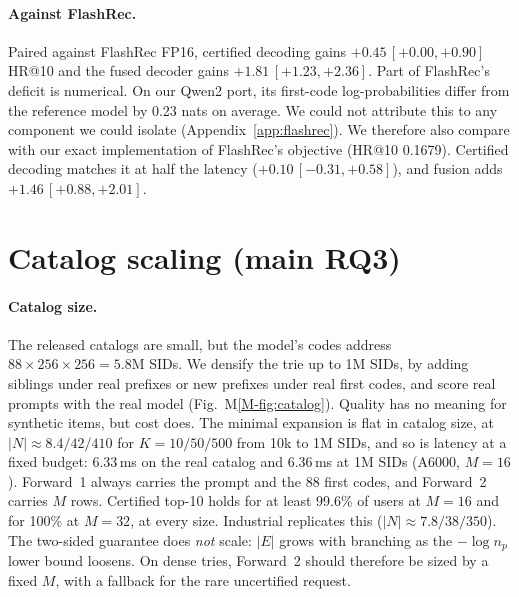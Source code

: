 \documentclass[sigconf,anonymous]{acmart}
\begin{document}
\paragraph{Against FlashRec.} Paired against FlashRec FP16, certified decoding gains $+0.45\,[+0.00,+0.90]$
HR@10 and the fused decoder gains $+1.81\,[+1.23,+2.36]$. Part of FlashRec's deficit is numerical. On our Qwen2
port, its first-code log-probabilities differ from the reference model by 0.23 nats on average. We could not
attribute this to any component we could isolate (Appendix~\ref{app:flashrec}). We therefore also compare with
our exact implementation of FlashRec's objective (HR@10 0.1679). Certified decoding matches it at half the
latency ($+0.10\,[-0.31,+0.58]$), and fusion adds $+1.46\,[+0.88,+2.01]$.


\section{Catalog scaling (main RQ3)}
\paragraph{Catalog size.} The released catalogs are small, but the model's codes address
$88\times256\times256=5.8$M SIDs. We densify the trie up to 1M SIDs, by adding siblings under real prefixes or
new prefixes under real first codes, and score real prompts with the real model (Fig.~M\ref{M-fig:catalog}). Quality
has no meaning for synthetic items, but cost does. The minimal expansion is flat in catalog size, at
$|N|\approx8.4/42/410$ for $K=10/50/500$ from 10k to 1M SIDs, and so is latency at a fixed budget: 6.33\,ms on
the real catalog and 6.36\,ms at 1M SIDs (A6000, $M=16$). Forward~1 always carries the prompt and the 88 first
codes, and Forward~2 carries $M$ rows. Certified top-10 holds for at least 99.6\% of users at $M=16$ and for 100\%
at $M=32$, at every size. Industrial replicates this ($|N|\approx7.8/38/350$). The two-sided guarantee does
\emph{not} scale: $|E|$ grows with branching as the $-\log n_p$ lower bound loosens. On dense tries, Forward~2
should therefore be sized by a fixed $M$, with a fallback for the rare uncertified request.
\end{document}
